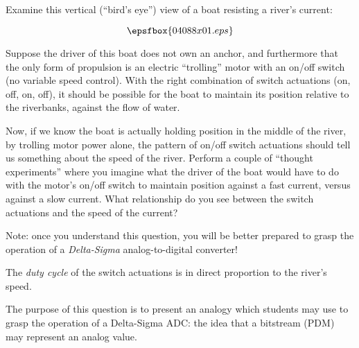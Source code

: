 

Examine this vertical (``bird's eye'') view of a boat resisting a river's current:

$$\epsfbox{04088x01.eps}$$

Suppose the driver of this boat does not own an anchor, and furthermore that the only form of propulsion is an electric ``trolling'' motor with an on/off switch (no variable speed control).  With the right combination of switch actuations (on, off, on, off), it should be possible for the boat to maintain its position relative to the riverbanks, against the flow of water.

Now, if we know the boat is actually holding position in the middle of the river, by trolling motor power alone, the pattern of on/off switch actuations should tell us something about the speed of the river.  Perform a couple of ``thought experiments'' where you imagine what the driver of the boat would have to do with the motor's on/off switch to maintain position against a fast current, versus against a slow current.  What relationship do you see between the switch actuations and the speed of the current?

\vskip 10pt

Note: once you understand this question, you will be better prepared to grasp the operation of a {\it Delta-Sigma} analog-to-digital converter!







The {\it duty cycle} of the switch actuations is in direct proportion to the river's speed.







The purpose of this question is to present an analogy which students may use to grasp the operation of a Delta-Sigma ADC: the idea that a bitstream (PDM) may represent an analog value.




